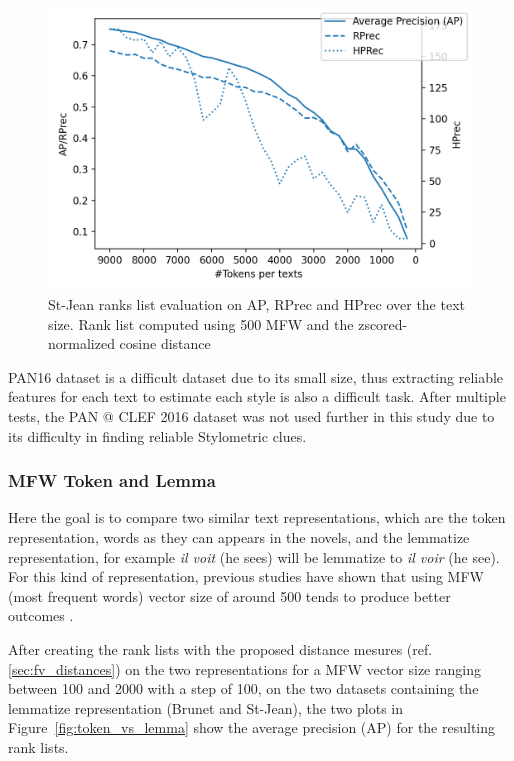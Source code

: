 \begin{figure}
  \centering
  \includegraphics[width=\linewidth]{img/degradation.png}
  \caption{St-Jean ranks list evaluation on AP, RPrec and HPrec over the text size. Rank list computed using 500 MFW and the zscored-normalized cosine distance}
  \label{img:degradation}
\end{figure}

PAN16 dataset is a difficult dataset due to its small size, thus extracting reliable features for each text to estimate each style is also a difficult task.
After multiple tests, the PAN @ CLEF 2016 dataset was not used further in this study due to its difficulty in finding reliable Stylometric clues.

\subsubsection{MFW Token and Lemma}

Here the goal is to compare two similar text representations, which are the token representation, words as they can appears in the novels, and the lemmatize representation, for example \textit{il voit} (he sees) will be lemmatize to \textit{il voir} (he see).
For this kind of representation, previous studies have shown that using MFW (most frequent words) vector size of around 500 tends to produce better outcomes \cite{savoy_text_representation}.

After creating the rank lists with the proposed distance mesures (ref. \ref{sec:fv_distances}) on the two representations for a MFW vector size ranging between 100 and 2000 with a step of 100, on the two datasets containing the lemmatize representation (Brunet and St-Jean), the two plots in Figure~\ref{fig:token_vs_lemma} show the average precision (AP) for the resulting rank lists.


